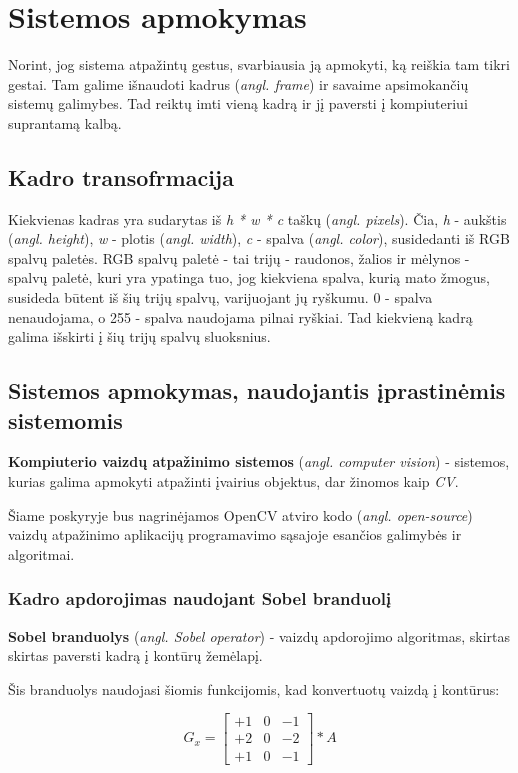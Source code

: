 \documentclass{VUMIFInfKursinis}
\begin{document}
\section{Sistemos apmokymas}
Norint, jog sistema atpažintų gestus, svarbiausia ją apmokyti, ką reiškia tam tikri gestai. Tam galime išnaudoti kadrus (\textit{angl. frame}) ir savaime apsimokančių sistemų galimybes. Tad reiktų imti vieną kadrą ir jį paversti į kompiuteriui suprantamą kalbą. 

\subsection{Kadro transofrmacija}
Kiekvienas kadras yra sudarytas iš \textit{h * w * c} taškų (\textit{angl. pixels}). Čia, \textit{h} - aukštis (\textit{angl. height}), \textit{w} - plotis (\textit{angl. width}), \textit{c} - spalva (\textit{angl. color}), susidedanti iš RGB spalvų paletės. RGB spalvų paletė - tai trijų - raudonos, žalios ir mėlynos - spalvų paletė, kuri yra ypatinga tuo, jog kiekviena spalva, kurią mato žmogus, susideda būtent iš šių trijų spalvų, varijuojant jų ryškumu. 0 - spalva nenaudojama, o 255 - spalva naudojama pilnai ryškiai. Tad kiekvieną kadrą galima išskirti į šių trijų spalvų sluoksnius.

\subsection{Sistemos apmokymas, naudojantis įprastinėmis sistemomis}
\textbf{Kompiuterio vaizdų atpažinimo sistemos} (\textit{angl. computer vision}) - sistemos, kurias galima apmokyti atpažinti įvairius objektus, dar žinomos kaip \textit{CV}.

Šiame poskyryje bus nagrinėjamos OpenCV atviro kodo (\textit{angl. open-source}) vaizdų atpažinimo aplikacijų programavimo sąsajoje esančios galimybės ir algoritmai.

\subsubsection{Kadro apdorojimas naudojant Sobel branduolį}
\textbf{Sobel branduolys} (\textit{angl. Sobel operator}) - vaizdų apdorojimo algoritmas, skirtas skirtas paversti kadrą į kontūrų žemėlapį.

Šis branduolys naudojasi šiomis funkcijomis, kad konvertuotų vaizdą į kontūrus:

\begin{equation}\label{eq:sobelgx}
	G_x = 
	\begin{bmatrix}
	+1 & 0 & -1 \\
	+2 & 0 & -2 \\
	+1 & 0 & -1
	\end{bmatrix} * A
\end{equation}
	
\end{document}
